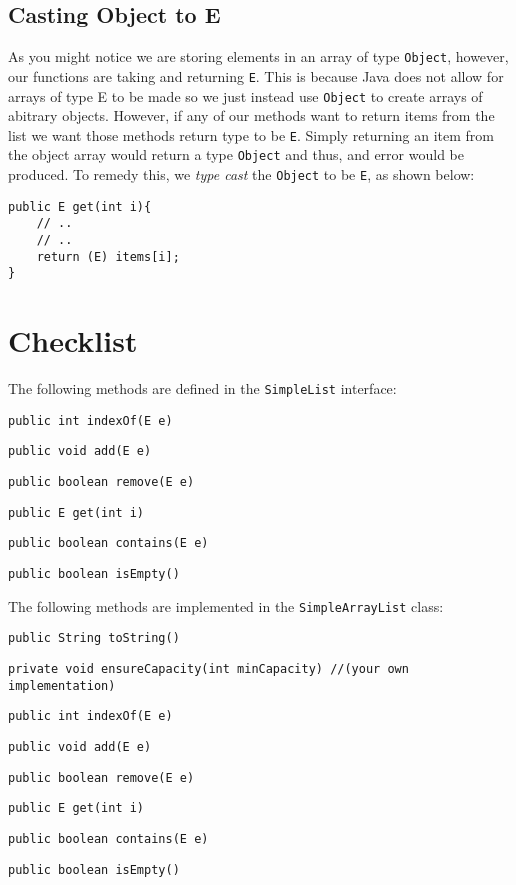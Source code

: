 \documentclass[a4paper]{article}
\begin{document}
\subsection*{Casting Object to E}

As you might notice we are storing elements in an array of type
\lstinline|Object|, however, our functions are taking and returning
\lstinline|E|. This is because Java does not allow for arrays of type E to be
made so we just instead use \lstinline|Object| to create arrays of abitrary
objects. However, if any of our methods want to return items from the list we 
want those methods return type to be \lstinline|E|. Simply returning an item
from the object array would return a type \lstinline|Object| and thus, and 
error would be produced. To remedy this, we \textit{type cast} the \lstinline|Object|
to be \lstinline|E|, as shown below:
\begin{lstlisting}[frame=trBL, basicstyle=\small]
public E get(int i){
    // ..
    // ..
    return (E) items[i];
}
\end{lstlisting}

\section*{Checklist}
\begin{todolist}
	\item The following methods are defined in the \lstinline|SimpleList| interface:
	\begin{todolist}
		\item \lstinline|public int indexOf(E e)| 
		\item \lstinline|public void add(E e)| 
		\item \lstinline|public boolean remove(E e)| 
		\item \lstinline|public E get(int i)| 
		\item \lstinline|public boolean contains(E e)| 
		\item \lstinline|public boolean isEmpty()| 
	\end{todolist}
	\item The following methods are implemented in the \lstinline|SimpleArrayList| class:
	\begin{todolist}
		\item \lstinline|public String toString()| 
		\item \lstinline|private void ensureCapacity(int minCapacity) //(your own implementation)| 
		\item \lstinline|public int indexOf(E e)| 
		\item \lstinline|public void add(E e)| 
		\item \lstinline|public boolean remove(E e)| 
		\item \lstinline|public E get(int i)| 
		\item \lstinline|public boolean contains(E e)| 
		\item \lstinline|public boolean isEmpty()| 
	\end{todolist}
\end{todolist}




\end{document}
